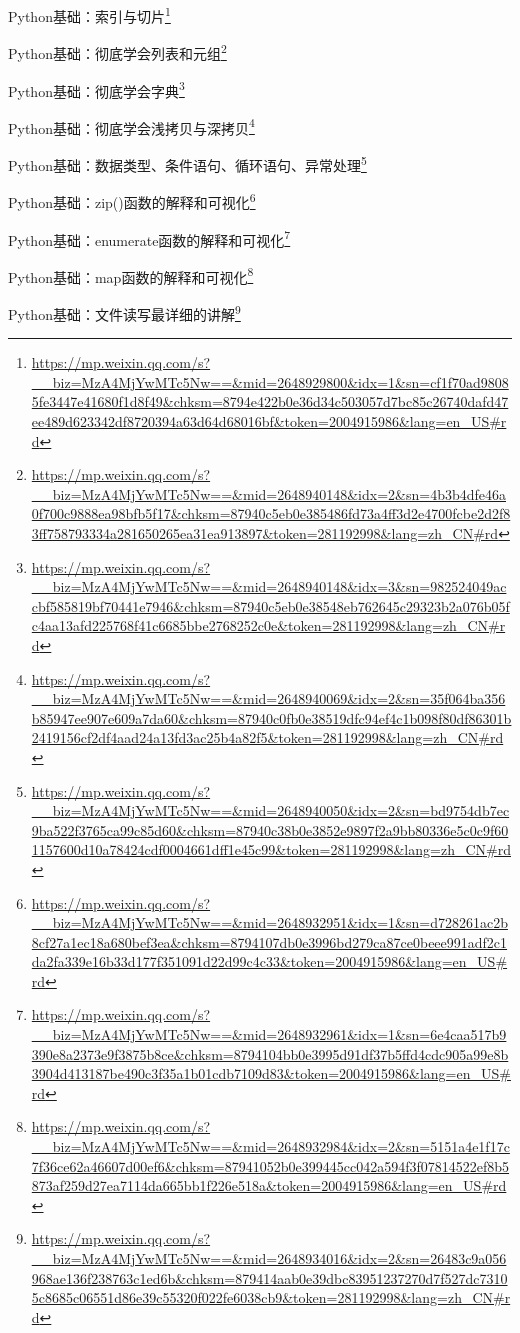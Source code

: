 \documentclass[]{ctexbook}
\renewcommand{\href}[2]{#2\footnote{\url{#1}}}
\begin{document}
\href{https://mp.weixin.qq.com/s?__biz=MzA4MjYwMTc5Nw==\&mid=2648929800\&idx=1\&sn=cf1f70ad98085fe3447e41680f1d8f49\&chksm=8794e422b0e36d34c503057d7bc85c26740dafd47ee489d623342df8720394a63d64d68016bf\&token=2004915986\&lang=en_US\#rd}{Python基础：索引与切片}

\href{https://mp.weixin.qq.com/s?__biz=MzA4MjYwMTc5Nw==\&mid=2648940148\&idx=2\&sn=4b3b4dfe46a0f700c9888ea98bfb5f17\&chksm=87940c5eb0e385486fd73a4ff3d2e4700fcbe2d2f83ff758793334a281650265ea31ea913897\&token=281192998\&lang=zh_CN\#rd}{Python基础：彻底学会列表和元组}

\href{https://mp.weixin.qq.com/s?__biz=MzA4MjYwMTc5Nw==\&mid=2648940148\&idx=3\&sn=982524049accbf585819bf70441e7946\&chksm=87940c5eb0e38548eb762645c29323b2a076b05fc4aa13afd225768f41c6685bbe2768252c0e\&token=281192998\&lang=zh_CN\#rd}{Python基础：彻底学会字典}

\href{https://mp.weixin.qq.com/s?__biz=MzA4MjYwMTc5Nw==\&mid=2648940069\&idx=2\&sn=35f064ba356b85947ee907e609a7da60\&chksm=87940c0fb0e38519dfc94ef4c1b098f80df86301b2419156cf2df4aad24a13fd3ac25b4a82f5\&token=281192998\&lang=zh_CN\#rd}{Python基础：彻底学会浅拷贝与深拷贝}

\href{https://mp.weixin.qq.com/s?__biz=MzA4MjYwMTc5Nw==\&mid=2648940050\&idx=2\&sn=bd9754db7ec9ba522f3765ca99c85d60\&chksm=87940c38b0e3852e9897f2a9bb80336e5c0c9f601157600d10a78424cdf0004661dff1e45c99\&token=281192998\&lang=zh_CN\#rd}{Python基础：数据类型、条件语句、循环语句、异常处理}

\href{https://mp.weixin.qq.com/s?__biz=MzA4MjYwMTc5Nw==\&mid=2648932951\&idx=1\&sn=d728261ac2b8cf27a1ec18a680bef3ea\&chksm=8794107db0e3996bd279ca87ce0beee991adf2c1da2fa339e16b33d177f351091d22d99c4c33\&token=2004915986\&lang=en_US\#rd}{Python基础：zip()函数的解释和可视化}

\href{https://mp.weixin.qq.com/s?__biz=MzA4MjYwMTc5Nw==\&mid=2648932961\&idx=1\&sn=6e4caa517b9390e8a2373e9f3875b8ce\&chksm=8794104bb0e3995d91df37b5ffd4cdc905a99e8b3904d413187be490c3f35a1b01cdb7109d83\&token=2004915986\&lang=en_US\#rd}{Python基础：enumerate函数的解释和可视化}

\href{https://mp.weixin.qq.com/s?__biz=MzA4MjYwMTc5Nw==\&mid=2648932984\&idx=2\&sn=5151a4e1f17c7f36ce62a46607d00ef6\&chksm=87941052b0e399445cc042a594f3f07814522ef8b5873af259d27ea7114da665bb1f226e518a\&token=2004915986\&lang=en_US\#rd}{Python基础：map函数的解释和可视化}

\href{https://mp.weixin.qq.com/s?__biz=MzA4MjYwMTc5Nw==\&mid=2648934016\&idx=2\&sn=26483c9a056968ae136f238763c1ed6b\&chksm=879414aab0e39dbc83951237270d7f527dc73105c8685c06551d86e39c55320f022fe6038cb9\&token=281192998\&lang=zh_CN\#rd}{Python基础：文件读写最详细的讲解}
\end{document}
